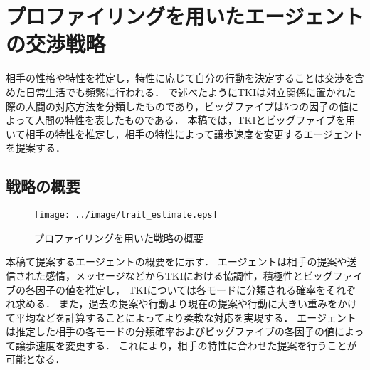 

\chapter{プロファイリングを用いたエージェントの交渉戦略}
\label{chap:profiling}
相手の性格や特性を推定し，特性に応じて自分の行動を決定することは交渉を含めた日常生活でも頻繁に行われる．
で述べたようにTKIは対立関係に置かれた際の人間の対応方法を分類したものであり，ビッグファイブは5つの因子の値によって人間の特性を表したものである．
本稿では，TKIとビッグファイブを用いて相手の特性を推定し，相手の特性によって譲歩速度を変更するエージェントを提案する．

\section{戦略の概要}
\begin{figure}[tb]
    \centering
    \texttt{[image: ../image/trait\_estimate.eps]}
    \caption{プロファイリングを用いた戦略の概要}
    \label{fig:trait_estimate}
\end{figure}

本稿て提案するエージェントの概要をに示す．
エージェントは相手の提案や送信された感情，メッセージなどからTKIにおける協調性，積極性とビッグファイブの各因子の値を推定し，
TKIについては各モードに分類される確率をそれぞれ求める．
また，過去の提案や行動より現在の提案や行動に大きい重みをかけて平均などを計算することによってより柔軟な対応を実現する．
エージェントは推定した相手の各モードの分類確率およびビッグファイブの各因子の値によって譲歩速度を変更する．
これにより，相手の特性に合わせた提案を行うことが可能となる．

